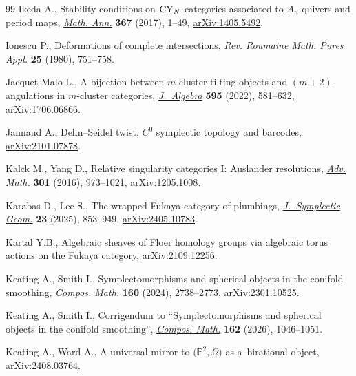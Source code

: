 \documentclass[pdftex]{sigma}
\theoremstyle{definition}
\numberwithin{equation}{section}
\begin{document}
\begin{thebibliography}{99}
Ikeda A., Stability conditions on {${\rm CY}_N$} categories associated to
 {$A_n$}-quivers and period maps,
 \href{https://doi.org/10.1007/s00208-016-1375-4}{\textit{Math. Ann.}}
 \textbf{367} (2017), 1--49,
 \href{http://arxiv.org/abs/1405.5492}{arXiv:1405.5492}.

Ionescu P., Deformations of complete intersections, \textit{Rev. Roumaine Math.
 Pures Appl.} \textbf{25} (1980), 751--758.

Jacquet-Malo L., A bijection between {$m$}-cluster-tilting objects and
 {$(m+2)$}-angulations in {$m$}-cluster categories,
 \href{https://doi.org/10.1016/j.jalgebra.2021.11.041}{\textit{J.~Algebra}}
 \textbf{595} (2022), 581--632,
 \href{http://arxiv.org/abs/1706.06866}{arXiv:1706.06866}.

Jannaud A., Dehn--{S}eidel twist, ${C}^0$ symplectic topology and barcodes,
 \href{http://arxiv.org/abs/2101.07878}{arXiv:2101.07878}.

Kalck M., Yang D., Relative singularity categories {I}: {A}uslander
 resolutions, \href{https://doi.org/10.1016/j.aim.2016.06.011}{\textit{Adv.
 Math.}} \textbf{301} (2016), 973--1021,
 \href{http://arxiv.org/abs/1205.1008}{arXiv:1205.1008}.

Karabas D., Lee S., The wrapped {F}ukaya category of plumbings,
 \href{https://doi.org/10.4310/jsg.250820172316}{\textit{J.~Symplectic Geom.}}
 \textbf{23} (2025), 853--949,
 \href{http://arxiv.org/abs/2405.10783}{arXiv:2405.10783}.

Kartal Y.B., Algebraic sheaves of {F}loer homology groups via algebraic torus
 actions on the {F}ukaya category,
 \href{http://arxiv.org/abs/2109.12256}{arXiv:2109.12256}.

Keating A., Smith I., Symplectomorphisms and spherical objects in the conifold
 smoothing, \href{https://doi.org/10.1112/S0010437X24007425}{\textit{Compos.
 Math.}} \textbf{160} (2024), 2738--2773,
 \href{http://arxiv.org/abs/2301.10525}{arXiv:2301.10525}.

Keating A., Smith I., Corrigendum to ``Symplectomorphisms and spherical objects
 in the conifold smoothing'',
 \href{https://doi.org/10.1017/S0010437X26103297}{\textit{Compos. Math.}}
 \textbf{162} (2026), 1046--1051.

Keating A., Ward A., A universal mirror to $\bigl(\mathbb{P}^2,\Omega\bigr)$ as
 a~birational object,
 \href{http://arxiv.org/abs/2408.03764}{arXiv:2408.03764}.


\end{thebibliography}
\end{document}
